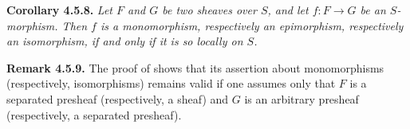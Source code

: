 \medskip
\noindent{}\textbf{Corollary 4.5.8.}
\textit{Let \(F\) and \(G\) be two sheaves over \(S\), and let
\(f:F\to G\) be an \(S\)-morphism. Then \(f\) is a monomorphism,
respectively an epimorphism, respectively an isomorphism, if and only if it
is so locally on \(S\).}

\medskip
\noindent{}\textbf{Remark 4.5.9.}
The proof of  shows that its assertion about monomorphisms
(respectively, isomorphisms) remains valid if one assumes only that \(F\)
is a separated presheaf (respectively, a sheaf) and \(G\) is an arbitrary
presheaf (respectively, a separated presheaf).

